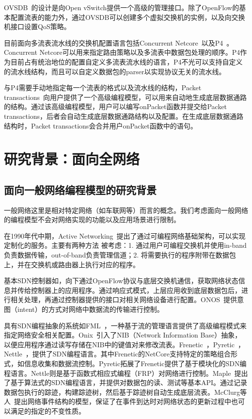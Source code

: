 \documentclass{ctexart}
\begin{document}
OVSDB~\cite{pfaff2013open}的设计是向Open vSwitch提供一个高级的管理接口。除了OpenFlow的基本配置流表的能力外，通过OVSDB可以创建多个虚拟交换机的实例，以及向交换机接口设置QoS策略。

目前面向多流表流水线的交换机配置语言包括Concurrent Netcore~\cite{schlesinger2014concurrent}以及P4~\cite{P4}。Concurrent Netcore可以用来指定路由策略以及多流表中数据包处理的顺序。P4作为目前占有统治地位的配置自定义多流表流水线的语言，P4不光可以支持自定义的流水线结构，而且可以自定义数据包的parser以实现协议无关的流水线。


与P4需要手动地指定每一个流表的格式以及流水线的结构，Packet transactions~\cite{sivaraman2016packet}向用户提供了一个高级编程模型，可以用来自动地生成底层数据通路的结构。通过该高级编程模型，用户可以编写onPacket函数并提交给Packet transactions，后者会自动生成底层数据通路结构以及配置。在生成底层数据通路结构时，Packet transactions会合并用户onPacket函数中的语句。


\section{研究背景：面向全网络}


\subsection{面向一般网络编程模型的研究背景}


一般网络这里是相对特定网络（如车联网等）而言的概念。我们考虑面向一般网络的编程模型不会对网络实现的功能以及应用场景进行限制。

在1990年代中期，Active Networking~\cite{tennenhouse1997survey,tennenhouse1996towards}提出了通过可编程网络基础架构，可以实现定制化的服务。主要有两种方法
被考虑：1. 通过用户可编程交换机并使用in-band负责数据传输，out-of-band负责管理信道；2. 将需要执行的程序附带在数据包上，并在交换机或路由器上执行对应的程序。

基本SDN控制器如\cite{gude2008nox,erickson2013beacon,medved2014opendaylight,shalimov2013advanced}，向下通过OpenFlow协议与底层交换机通信，获取网络状态信息并传给控制器上的应用程序。通过响应式模式，上层应用收到底层数据包后，进行相关处理，再通过控制器提供的接口对相关网络设备进行配置。ONOS~\cite{berde2014onos}提供意图（intent）的方式对网络中数据流的传输进行控制。

具有SDN编程抽象的系统如FML~\cite{hinrichs2009practical}，一种基于流的管理语言提供了高级编程模式来指定网络安全相关配置。Onix~\cite{koponen2010onix}引入了NIB（Network Information Base）抽象，以便应用程序通过读写存储在NIB中的键值对来修改流表。Frenetic~\cite{foster2011frenetic}，Pyretic~\cite{reich2013modular}，Nettle~\cite{voellmy2011nettle}，提供了SDN编程语言。其中Frenetic的NetCore支持特定的策略组合形式，如信息收集和数据流控制。Pyretic拓展了Frenetic提供了基于模块化的SDN编程语言。Nettle则是基于函数式相应式编程（FRP）对网络进行控制。Maple~\cite{maple}提出了基于算法式的SDN编程语言，并提供对数据包的读、测试等基本API。通过记录数据包执行的踪迹，构建踪迹树，然后基于踪迹树自动生成底层流表。McClurg等人~\cite{mcclurg2016event}提出网络事件结构的模型，保证了在事件到达时对网络状态的更新过程中也可以满足的指定的不变性质。
\end{document}
